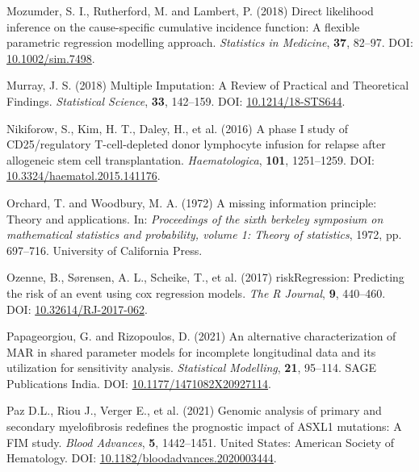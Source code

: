 \documentclass[
  letterpaper,
  DIV=11,
  numbers=noendperiod]{scrreprt}
\newlength{\cslhangindent}
\newlength{\cslentryspacingunit} %
\newenvironment{CSLReferences}[2] %
 {%
  \setlength{\parindent}{0pt}
  \ifodd #1
  \let\oldpar\par
  \def\par{\hangindent=\cslhangindent\oldpar}
  \fi
  \setlength{\parskip}{#2\cslentryspacingunit}
 }%
 {}
\begin{document}
\begin{CSLReferences}{1}{0}
\leavevmode{}%
Mozumder, S. I., Rutherford, M. and Lambert, P. (2018) Direct likelihood
inference on the cause-specific cumulative incidence function: {A}
flexible parametric regression modelling approach. \emph{Statistics in
Medicine}, \textbf{37}, 82--97. DOI:
\href{https://doi.org/10.1002/sim.7498}{10.1002/sim.7498}.

\leavevmode{}%
Murray, J. S. (2018) Multiple {Imputation}: {A Review} of {Practical}
and {Theoretical Findings}. \emph{Statistical Science}, \textbf{33},
142--159. DOI:
\href{https://doi.org/10.1214/18-STS644}{10.1214/18-STS644}.

\leavevmode{}%
Nikiforow, S., Kim, H. T., Daley, H., et al. (2016) A phase {I} study of
{CD25}/regulatory {T-cell-depleted} donor lymphocyte infusion for
relapse after allogeneic stem cell transplantation.
\emph{Haematologica}, \textbf{101}, 1251--1259. DOI:
\href{https://doi.org/10.3324/haematol.2015.141176}{10.3324/haematol.2015.141176}.

\leavevmode{}%
Orchard, T. and Woodbury, M. A. (1972) A missing information principle:
Theory and applications. In: \emph{Proceedings of the sixth berkeley
symposium on mathematical statistics and probability, volume 1: {Theory}
of statistics}, 1972, pp. 697--716. University of California Press.

\leavevmode{}%
Ozenne, B., Sørensen, A. L., Scheike, T., et al. (2017)
{riskRegression}: {Predicting} the risk of an event using cox regression
models. \emph{The R Journal}, \textbf{9}, 440--460. DOI:
\href{https://doi.org/10.32614/RJ-2017-062}{10.32614/RJ-2017-062}.

\leavevmode{}%
Papageorgiou, G. and Rizopoulos, D. (2021) An alternative
characterization of {MAR} in shared parameter models for incomplete
longitudinal data and its utilization for sensitivity analysis.
\emph{Statistical Modelling}, \textbf{21}, 95--114. SAGE Publications
India. DOI:
\href{https://doi.org/10.1177/1471082X20927114}{10.1177/1471082X20927114}.

\leavevmode{}%
Paz D.L., Riou J., Verger E., et al. (2021) Genomic analysis of primary
and secondary myelofibrosis redefines the prognostic impact of {ASXL1}
mutations: {A FIM} study. \emph{Blood Advances}, \textbf{5}, 1442--1451.
United States: American Society of Hematology. DOI:
\href{https://doi.org/10.1182/bloodadvances.2020003444}{10.1182/bloodadvances.2020003444}.


\end{CSLReferences}
\end{document}
